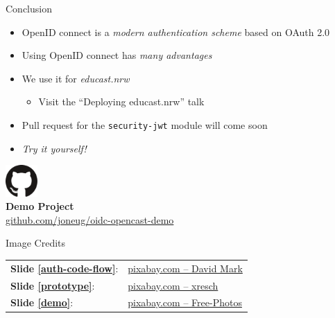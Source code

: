 \documentclass[aspectratio=169]{beamer}
\begin{document}
\begin{frame}{Conclusion}
	\begin{itemize}
		\item OpenID connect is a \emph{modern authentication scheme} based on OAuth 2.0
		\pause
		\item Using OpenID connect has \emph{many advantages}
		\pause
		\item We use it for \emph{educast.nrw}
		\begin{itemize}
			\item Visit the \enquote{Deploying educast.nrw} talk 
		\end{itemize}
		\pause
		\item Pull request for the \texttt{security-jwt} module will come soon
		\item \emph{Try it yourself!}
	\end{itemize}
	\vspace{0.5em}
	\centering
	\includegraphics[height=1.2cm]{figures/github-logo} \\
	\textbf{Demo Project} \\
	\href{http://github.com/joneug/oidc-opencast-demo}{github.com/joneug/oidc-opencast-demo}
\end{frame}

\makeref

\begin{frame}{Image Credits}
	\footnotesize
	\begin{tabular}{ll}
		\textbf{Slide \ref{auth-code-flow}}: & \href{https://pixabay.com/images/id-1751463/}{pixabay.com -- David Mark} \\
		\textbf{Slide \ref{prototype}}: & \href{https://pixabay.com/images/id-4056027/}{pixabay.com -- xresch} \\
		\textbf{Slide \ref{demo}}:& \href{https://pixabay.com/images/id-1209641/}{pixabay.com -- Free-Photos}
	\end{tabular}
\end{frame}
\end{document}
